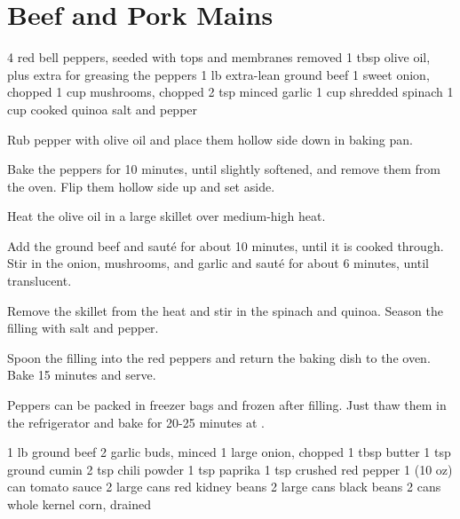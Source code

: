 \chapter{Beef and Pork Mains}
\begin{comment} %
  Naturally, all of these are delicious.
  Need I say more?
\end{comment}

\freezerfriendly
\begin{ingreds}
  4 red bell peppers, seeded with tops and membranes removed
  1 tbsp olive oil, plus extra for greasing the peppers
  1 lb extra-lean ground beef
  1 sweet onion, chopped
  1 cup mushrooms, chopped
  2 tsp minced garlic
  1 cup shredded spinach
  1 cup cooked quinoa
  salt and pepper
\end{ingreds}
\begin{method}
  Rub pepper with olive oil and place them
  hollow side down in baking pan.

  Bake the peppers for 10 minutes, until slightly softened,
  and remove them from the oven.
  Flip them hollow side up and set aside.

  Heat the olive oil in a large skillet over
  medium-high heat.

  Add the ground beef and saut\'e for about 10 minutes,
  until it is cooked through.
  Stir in the onion, mushrooms, and garlic and saut\'e
  for about 6 minutes, until translucent.

  Remove the skillet from the heat and stir in
  the spinach and quinoa.
  Season the filling with salt and pepper.

  Spoon the filling into the red peppers
  and return the baking dish to the oven.
  Bake 15 minutes and serve.
\end{method}
\begin{tips}
  Peppers can be packed in freezer bags and frozen
  after filling.
  Just thaw them in the refrigerator
  and bake for 20-25 minutes at .
\end{tips}

\freezerfriendly
{}
\begin{ingreds}
  1  lb ground beef
  2 garlic buds, minced
  1 large onion, chopped
  1 tbsp butter
  1 tsp ground cumin
  2 tsp chili powder
  1 tsp paprika
  1  tsp crushed red pepper
  1 (10 oz) can tomato sauce
  2 large cans red kidney beans
  2 large cans black beans
  2 cans whole kernel corn, drained
\end{ingreds}


